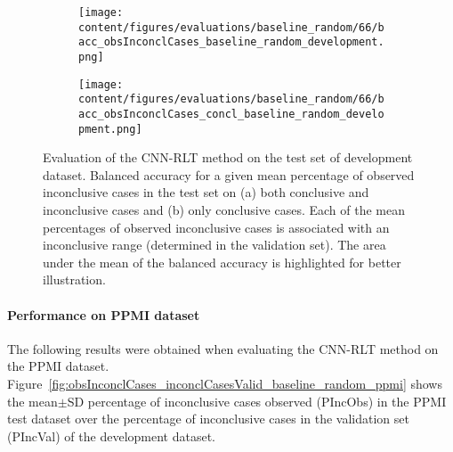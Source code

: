 \begin{figure}[ht]
  \begin{subfigure}{0.5\textwidth}
    \centering
    \texttt{[image: content/figures/evaluations/baseline\_random/66/bacc\_obsInconclCases\_baseline\_random\_development.png]}
    \subcaption{}
    \label{fig:bacc_obsInconclCases_baseline_random_development}
  \end{subfigure}
  \hfill
  \begin{subfigure}{0.5\textwidth}
    \centering
    \texttt{[image: content/figures/evaluations/baseline\_random/66/bacc\_obsInconclCases\_concl\_baseline\_random\_development.png]}
    \subcaption{}
    \label{fig:bacc_obsInconclCases_concl_baseline_random_development}
  \end{subfigure}

  \caption{Evaluation of the CNN-RLT method on the test set of development dataset.
  Balanced accuracy for a given mean percentage of observed inconclusive cases in the test set on 
  (a) both conclusive and inconclusive cases and (b) only conclusive cases. 
  Each of the mean percentages of observed inconclusive cases is associated with an inconclusive range (determined in the validation set). 
  The area under the mean of the balanced accuracy is highlighted for better illustration.}
  \label{fig:bacc_obsInconclCases_baseline_random_development_full}
\end{figure}





\paragraph{Performance on PPMI dataset}

The following results were obtained when evaluating the CNN-RLT method on the PPMI dataset.
Figure~\ref{fig:obsInconclCases_inconclCasesValid_baseline_random_ppmi} shows the
mean$\pm$SD percentage of inconclusive cases observed (PIncObs) in the PPMI test dataset 
over the percentage of inconclusive cases in the validation set (PIncVal) of the development dataset.


